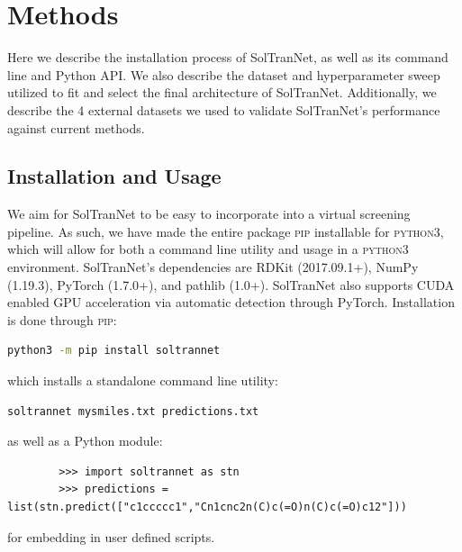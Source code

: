 \documentclass[journal=jmcmar,manuscript=article]{achemso}
\begin{document}
\section{Methods}

Here we describe the installation process of SolTranNet, as well as its command line and Python API.
We also describe the dataset and hyperparameter sweep utilized to fit and select the final architecture of SolTranNet.
Additionally, we describe the 4 external datasets we used to validate SolTranNet's performance against current methods.

\subsection{Installation and Usage}
We aim for SolTranNet to be easy to incorporate into a virtual screening pipeline.
As such, we have made the entire package \textsc{\textsc{pip}} installable for \textsc{python3}, which will allow for both a command line utility and usage in a \textsc{python3} environment. 
SolTranNet's dependencies are RDKit\cite{rdkit} (2017.09.1+),  NumPy\cite{numpy} (1.19.3), PyTorch\cite{pytorch} (1.7.0+), and pathlib (1.0+).
SolTranNet also supports CUDA enabled GPU acceleration via automatic detection through PyTorch.  Installation is done through \textsc{pip}: \\
        \begin{lstlisting}[frame=none,language=bash]
 python3 -m pip install soltrannet
        \end{lstlisting}
which installs a standalone command line utility:
        \begin{lstlisting}[frame=none,language=bash]
soltrannet mysmiles.txt predictions.txt
        \end{lstlisting}
as well as a Python module:
        \begin{verbatim}
        >>> import soltrannet as stn
        >>> predictions = list(stn.predict(["c1ccccc1","Cn1cnc2n(C)c(=O)n(C)c(=O)c12"]))
        \end{verbatim}
 for embedding in user defined scripts.
\end{document}
